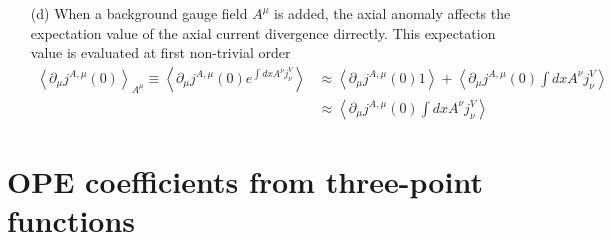 \documentclass[10pt, a4paper]{article}
\begin{document}
{\begin{enumerate}
\begin{align*}
    &= -i  \langle \int \text{d}x_1 \  \partial^\mu j_{\mu}^{A}(x_1) j_{\nu}^{V}(x + x_1)\rangle = -i   \langle  \  \partial^\mu j_{\mu}^{A}(0) j_{\nu}^{V}(x)\rangle \int \text{d}x_1
  \end{align*}
  and 
  \begin{align*}
    - \frac{1}{2\pi}\int \text{d}p\ e^{i p \cdot x} a\epsilon_{\mu\nu} p^\mu = a\ i\ \epsilon_{\mu\nu} \partial^\mu \delta(x)
  \end{align*}
  which shows that the divergence of the axial current has a non-vanishing correlator (can't be explained by contact terms since they would vanish through $\delta j_\nu(x) = 0$) with the vector current contradicting the Ward identity for the axial current. 
  
  \item[(d)] When a background gauge field $A^{\mu}$ is added, the axial anomaly affects the expectation value of the axial current divergence dirrectly. This expectation value is evaluated at first non-trivial order 
  \begin{align*}
    \left\langle\partial_\mu j^{A, \mu}(0)\right\rangle_{A^\mu} \equiv\left\langle\partial_\mu j^{A, \mu}(0) e^{\int d x A^\nu j_\nu^V}\right\rangle &\approx \left\langle\partial_\mu j^{A, \mu}(0) 1\right\rangle  +   \left\langle\partial_\mu j^{A, \mu}(0) \int d x A^\nu j_\nu^V\right\rangle \\
    &\approx \left\langle\partial_\mu j^{A, \mu}(0) \int d x A^\nu j_\nu^V\right\rangle 
  \end{align*}
\end{enumerate}

\section{OPE coefficients from three-point functions}

}
\end{document}
